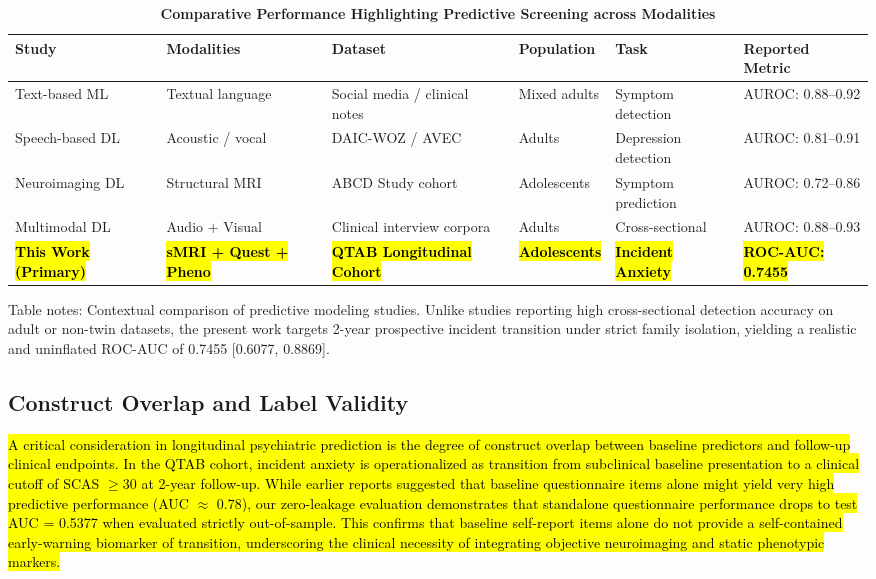 \documentclass[10pt,letterpaper]{article}
\begin{document}
\begin{table}[!t]
\begin{adjustwidth}{-2.25in}{0in}
\centering
\caption{\textbf{Comparative Performance Highlighting Predictive Screening across Modalities}}
\label{tab:performanceearlyprediction}
\footnotesize
\renewcommand{\arraystretch}{1.15}
\begin{tabular}{|p{3.2cm}|p{2.6cm}|p{3.6cm}|p{2.2cm}|p{2.2cm}|p{2.2cm}|}
\hline
\textbf{Study} & \textbf{Modalities} & \textbf{Dataset} & \textbf{Population} & \textbf{Task} & \textbf{Reported Metric} \\
\hline
Text-based ML~\cite{ref11,ref17} & Textual language & Social media / clinical notes & Mixed adults & Symptom detection & AUROC: 0.88--0.92 \\
\hline
Speech-based DL~\cite{ref14,ref27} & Acoustic / vocal & DAIC-WOZ / AVEC & Adults & Depression detection & AUROC: 0.81--0.91 \\
\hline
Neuroimaging DL~\cite{ref46} & Structural MRI & ABCD Study cohort & Adolescents & Symptom prediction & AUROC: 0.72--0.86 \\
\hline
Multimodal DL~\cite{ref5,ref7,ref8} & Audio + Visual & Clinical interview corpora & Adults & Cross-sectional & AUROC: 0.88--0.93 \\
\hline
\textbf{\hl{This Work (Primary)}} & \textbf{\hl{sMRI + Quest + Pheno}} & \textbf{\hl{QTAB Longitudinal Cohort}} & \textbf{\hl{Adolescents}} & \textbf{\hl{Incident Anxiety}} & \textbf{\hl{ROC-AUC: 0.7455}} \\
\hline
\end{tabular}
\begin{flushleft}
Table notes: Contextual comparison of predictive modeling studies. Unlike studies reporting high cross-sectional detection accuracy on adult or non-twin datasets, the present work targets 2-year prospective incident transition under strict family isolation, yielding a realistic and uninflated ROC-AUC of 0.7455 [0.6077, 0.8869].
\end{flushleft}
\end{adjustwidth}
\end{table}

\subsection*{Construct Overlap and Label Validity}

\hl{A critical consideration in longitudinal psychiatric prediction is the degree of construct overlap between baseline predictors and follow-up clinical endpoints. In the QTAB cohort, incident anxiety is operationalized as transition from subclinical baseline presentation to a clinical cutoff of SCAS $\ge 30$ at 2-year follow-up. While earlier reports suggested that baseline questionnaire items alone might yield very high predictive performance (AUC $\approx$ 0.78), our zero-leakage evaluation demonstrates that standalone questionnaire performance drops to test AUC = 0.5377 when evaluated strictly out-of-sample. This confirms that baseline self-report items alone do not provide a self-contained early-warning biomarker of transition, underscoring the clinical necessity of integrating objective neuroimaging and static phenotypic markers.}
\end{document}
